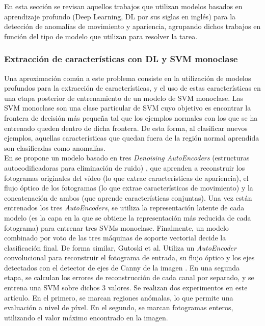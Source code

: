 \documentclass[../main.tex]{memoir}
\begin{document}
En esta sección se revisan aquellos trabajos que utilizan modelos
basados en aprendizaje profundo (Deep Learning, DL por sus siglas en
inglés) para la detección de anomalías de movimiento y apariencia,
agrupando dichos trabajos en función del tipo de modelo que utilizan
para resolver la tarea.

\subsubsection{Extracción de características con DL y SVM monoclase}
\label{sec:oneclass-svm}

Una aproximación común a este problema consiste en la utilización de
modelos profundos para la extracción de características, y el uso de
estas características en una etapa posterior de entrenamiento de un
modelo de SVM monoclase. Las SVM monoclase \cite{scholkopf2000support}
son una clase particular de SVM cuyo objetivo es encontrar la frontera
de decisión más pequeña tal que los ejemplos normales con los que
se ha entrenado queden dentro de dicha frontera. De esta forma, al
clasificar nuevos ejemplos, aquellas características que quedan fuera
de la región normal aprendida son clasificadas como anomalías.\\

En \cite{xu2015learning} se propone un modelo basado en tres
\textit{Denoising AutoEncoders} (estructuras autocodificadoras para
eliminación de ruido) \cite{vincent2008extracting}, que aprenden a
reconstruir los fotogramas originales del vídeo (lo que extrae
características de apariencia), el flujo óptico de los fotogramas
\cite{horn1981determining} (lo que extrae características de
movimiento) y la concatenación de ambos (que aprende características
conjuntas). Una vez están entrenados los tres \textit{AutoEncoders},
se utiliza la representación latente de cada modelo (es la capa en la
que se obtiene la representación más reducida de cada fotograma) para
entrenar tres SVMs monoclase. Finalmente, un modelo combinado por voto
de las tres máquinas de soporte vectorial decide la clasificación
final. De forma similar, Gutoski et al. \cite{gutoski2017detection}
Utiliza un \textit{AutoEncoder} convolucional para reconstruir el
fotograma de entrada, su flujo óptico y los ejes detectados con el
detector de ejes de Canny de la imagen \cite{canny1986computational}.
En una segunda etapa, se calculan los errores de reconstrucción de
cada canal por separado, y se entrena una SVM sobre dichos 3
valores. Se realizan dos experimentos en este artículo. En el primero,
se marcan regiones anómalas, lo que permite una evaluación a nivel de
píxel. En el segundo, se marcan fotogramas enteros, utilizando el
valor máximo encontrado en la imagen.\\
\end{document}
